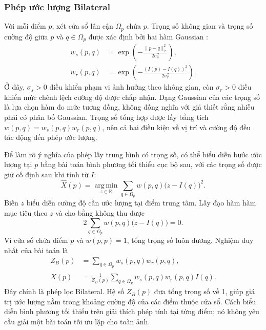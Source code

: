 \documentclass[14pt,a4paper,oneside]{extreport}
\begin{document}
\subsubsection{Phép ước lượng Bilateral}
Với mỗi điểm $p$, xét cửa sổ lân cận $\Omega_p$ chứa $p$. Trọng số
không gian và trọng số cường độ giữa $p$ và $q\in\Omega_p$ được
xác định bởi hai hàm Gaussian \cite{tomasi1998bilateral}:
\begingroup
\setlength{\jot}{8pt}
\begin{align}
 w_s(p,q)&=\exp\!\left(-\frac{\lVert p-q\rVert_2^2}{2\sigma_s^2}\right),
 \label{eq:bilateral-spatial}\\
 w_r(p,q)&=\exp\!\left(-\frac{(I(p)-I(q))^2}{2\sigma_r^2}\right).
 \label{eq:bilateral-range}
\end{align}
\endgroup
Ở đây, $\sigma_s>0$ điều khiển phạm vi ảnh hưởng theo không gian,
còn $\sigma_r>0$ điều khiển mức chênh lệch cường độ được chấp nhận.
Dạng Gaussian của các trọng số là lựa chọn hàm đo mức tương đồng,
không đồng nghĩa với giả thiết rằng nhiễu phải có phân bố Gaussian.
Trọng số tổng hợp được lấy bằng tích
$w(p,q)=w_s(p,q)w_r(p,q)$, nên cả hai điều kiện về vị trí và cường
độ đều tác động đến phép ước lượng.

Để làm rõ ý nghĩa của phép lấy trung bình có trọng số, có thể biểu
diễn bước ước lượng tại $p$ bằng bài toán bình phương tối thiểu cục
bộ sau, với các trọng số được giữ cố định sau khi tính từ $I$:
\begin{equation}
 \widehat X(p)=\operatorname*{arg\,min}_{z\in\mathbb R}
 \sum_{q\in\Omega_p}w(p,q)\bigl(z-I(q)\bigr)^2.
 \label{eq:bilateral-local-estimation}
\end{equation}
Biến $z$ biểu diễn cường độ cần ước lượng tại điểm trung tâm. Lấy
đạo hàm hàm mục tiêu theo $z$ và cho bằng không thu được
\begin{equation}
 2\sum_{q\in\Omega_p}w(p,q)\bigl(z-I(q)\bigr)=0.
 \label{eq:bilateral-stationary}
\end{equation}
Vì cửa sổ chứa điểm $p$ và $w(p,p)=1$, tổng trọng số luôn dương.
Nghiệm duy nhất của bài toán là
\begingroup
\setlength{\jot}{8pt}
\begin{align}
 Z_B(p)&=\sum_{q\in\Omega_p}w_s(p,q)w_r(p,q),
 \label{eq:bilateral-normalizer}\\
 \widehat X(p)&=\frac{1}{Z_B(p)}
 \sum_{q\in\Omega_p}w_s(p,q)w_r(p,q)I(q).
 \label{eq:bilateral-filter}
\end{align}
\endgroup
Đây chính là phép lọc Bilateral. Hệ số $Z_B(p)$ đưa tổng trọng số
về 1, giúp giá trị ước lượng nằm trong khoảng cường độ của các điểm
thuộc cửa sổ. Cách biểu diễn bình phương tối thiểu trên giải thích
phép tính tại từng điểm; nó không yêu cầu giải một bài toán tối ưu
lặp cho toàn ảnh.
\end{document}
